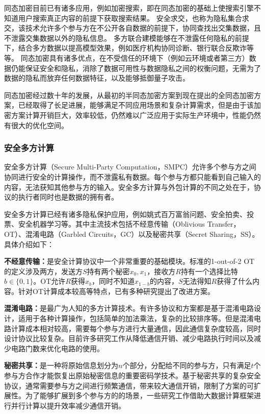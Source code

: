 同态加密目前已有诸多应用，例如加密搜索，即在同态加密的基础上使搜索引擎不知道用户搜索真正内容的前提下获取搜索结果。
安全求交，也称为隐私集合求交，该技术允许多个参与方在不公开各自数据的前提下，协同查找出交集数据，且不泄露交集数据以外的隐私信息。
多方联合建模能够在不泄露任何隐私的前提下，结合多方数据以提高模型效果，例如医疗机构协同诊断、银行联合反欺诈等等。
同态加密具有诸多优点，在不受信任的环境下（例如云环境或者第三方）数据仍能保证安全和隐私，消除了数据可用性与数据隐私之间的权衡问题，无需为了数据的隐私而放弃任何数据特征，以及能够抵御量子攻击。

同态加密经过数十年的发展，从最初的半同态加密方案到现在提出的全同态加密方案，已经取得了长足进展，能够满足不同应用场景和复杂计算需求，但是由于该加密方案计算开销巨大，效率较低，仍然难以广泛应用于实际生产环境中，性能仍然有很大的优化空间。

\subsubsection{安全多方计算}
安全多方计算（Secure Multi-Party Computation，SMPC）允许多个参与方之间协同进行安全的计算操作，而不泄露私有数据。每个参与方都只能看到自己输入的内容，无法获知其他参与方的输入。安全多方计算与外包计算的不同之处在于，协议的执行者同时也是数据的拥有者\cite{2018A}。

安全多方计算已经有诸多隐私保护应用，例如姚式百万富翁问题\cite{1982Protocols}、安全拍卖、投票、安全机器学习\cite{2017Oblivious}等。其中主流技术包括不经意传输（Oblivious Transfer，OT）、混淆电路（Garbled Circuits，GC）以及秘密共享（Secret Sharing，SS）。具体介绍如下：
\begin{compactitem}
	\item \textbf{不经意传输：}是安全计算协议中一个非常重要的基础模块。标准的1-out-of-2 OT的定义涉及两方，发送方$ S $持有两个秘密$ x_0,x_1$，接收方$ R $持有一个选择比特$ b\in\{0,1\} $。OT允许$ R $获得$ x_b $，同时不知道$ x_{1-b} $的内容，$ S $无法得知$ R $获得了什么内容。针对OT计算成本较高等特点，已有多种研究提出了改进方案。
	\item \textbf{混淆电路：}是最广为人知的多方计算技术。有许多协议和方案都是基于混淆电路设计，适用于各种计算操作，包括简单的加法乘法，复杂的比较排序等。但是混淆电路计算成本相对较高，需要每个参与方进行大量通信，因此通信复杂度较高，同时设计协议比较复杂。目前许多研究工作从降低通信开销\cite{goyal2008efficient}、减少电路执行时间\cite{malkhi2004fairplay}以及减少电路门数\cite{pinkas2009secure}来优化电路的使用。
	\item \textbf{秘密共享：}是一种将原始信息划分为$n$个部分，分配给不同的参与方，只有满足$t$个参与方合作才能恢复出原始秘密信息的重要密码学技术。基于秘密共享的复杂安全协议，通常需要参与方之间进行频繁通信，带来较大通信开销，限制了方案的可扩展性。为了能够扩展到多个参与方的的场景，一些研究工作借助大数据计算框架进行并行计算以提升效率减少通信开销。
\end{compactitem}

